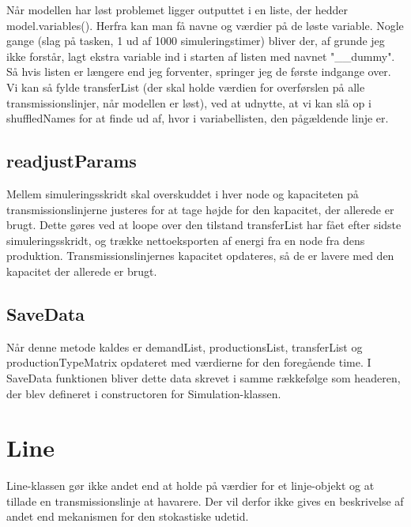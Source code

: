\documentclass{article}
\begin{document}
Når modellen har løst problemet ligger outputtet i en liste, der hedder model.variables(). Herfra kan man få navne og værdier på de løste variable. Nogle gange (slag på tasken, 1 ud af 1000 simuleringstimer) bliver der, af grunde jeg ikke forstår, lagt ekstra variable ind i starten af listen med navnet "\_\_dummy". Så hvis listen er længere end jeg forventer, springer jeg de første indgange over. Vi kan så fylde transferList (der skal holde værdien for overførslen på alle transmissionslinjer, når modellen er løst), ved at udnytte, at vi kan slå op i shuffledNames for at finde ud af, hvor i variabellisten, den pågældende linje er. 

\subsection{readjustParams}
Mellem simuleringsskridt skal overskuddet i hver node og kapaciteten på transmissionslinjerne justeres for at tage højde for den kapacitet, der allerede er brugt. Dette gøres ved at loope over den tilstand transferList har fået efter sidste simuleringsskridt, og trække nettoeksporten af energi fra en node fra dens produktion. Transmissionslinjernes kapacitet opdateres, så de er lavere med den kapacitet der allerede er brugt.

\subsection{SaveData}
Når denne metode kaldes er demandList, productionsList, transferList og productionTypeMatrix opdateret med værdierne for den foregående time. I SaveData funktionen bliver dette data skrevet i samme rækkefølge som headeren, der blev defineret i constructoren for Simulation-klassen. 

\section{Line}
Line-klassen gør ikke andet end at holde på værdier for et linje-objekt og at tillade en transmissionslinje at havarere. Der vil derfor ikke gives en beskrivelse af andet end mekanismen for den stokastiske udetid.
\end{document}
